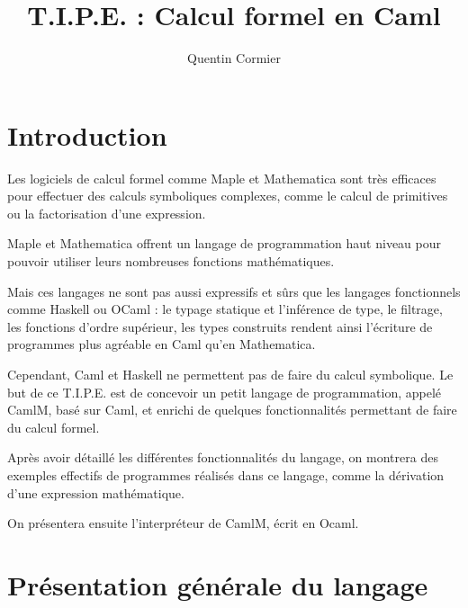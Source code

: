 \documentclass[a4paper, 12pt]{article}
\title{T.I.P.E. : Calcul formel en Caml}           %
\author{Quentin Cormier}
\date{}                   %
\begin{document}
\maketitle                    %



\tableofcontents              %


\section{Introduction}

Les logiciels de calcul formel comme Maple et Mathematica sont très efficaces pour effectuer des calculs symboliques complexes, comme le calcul de primitives ou la factorisation d'une expression.

Maple et Mathematica offrent un langage de programmation haut niveau pour pouvoir utiliser leurs nombreuses fonctions mathématiques.

Mais ces langages ne sont pas aussi expressifs et sûrs que les langages fonctionnels comme Haskell ou OCaml : le typage statique et l'inférence de type, le filtrage, les fonctions d'ordre supérieur, les types construits rendent ainsi l'écriture de programmes plus agréable en Caml qu'en Mathematica.

Cependant, Caml et Haskell ne permettent pas de faire du calcul symbolique.
Le but de ce T.I.P.E. est de concevoir un petit langage de programmation, appelé CamlM, basé sur Caml, et enrichi de quelques fonctionnalités permettant de faire du calcul formel.

Après avoir détaillé les différentes fonctionnalités du langage, on montrera des exemples effectifs de programmes réalisés dans ce langage, comme la dérivation d'une expression mathématique.

On présentera ensuite l'interpréteur de CamlM, écrit en Ocaml.


\section{Présentation générale du langage}            
\end{document}
